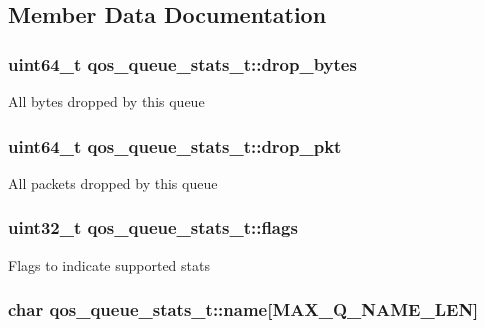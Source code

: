 \subsection{Member Data Documentation}
\hypertarget{structqos__queue__stats__t_a86e9a12c3218b8a91d62a3da95b2daf8}{
\subsubsection[{drop\-\_\-bytes}]{\setlength{\rightskip}{0pt plus 5cm}uint64\-\_\-t qos\-\_\-queue\-\_\-stats\-\_\-t\-::drop\-\_\-bytes}}\label{structqos__queue__stats__t_a86e9a12c3218b8a91d62a3da95b2daf8}
All bytes dropped by this queue \hypertarget{structqos__queue__stats__t_a68c4ac994cb234e4d12b8d41c726b5be}{
\subsubsection[{drop\-\_\-pkt}]{\setlength{\rightskip}{0pt plus 5cm}uint64\-\_\-t qos\-\_\-queue\-\_\-stats\-\_\-t\-::drop\-\_\-pkt}}\label{structqos__queue__stats__t_a68c4ac994cb234e4d12b8d41c726b5be}
All packets dropped by this queue \hypertarget{structqos__queue__stats__t_a151f189f991fa0564835e9e5c37bde29}{
\subsubsection[{flags}]{\setlength{\rightskip}{0pt plus 5cm}uint32\-\_\-t qos\-\_\-queue\-\_\-stats\-\_\-t\-::flags}}\label{structqos__queue__stats__t_a151f189f991fa0564835e9e5c37bde29}
Flags to indicate supported stats \hypertarget{structqos__queue__stats__t_a86a3a95e8e4a3bfaa4a18adf7e0e774b}{
\subsubsection[{name}]{\setlength{\rightskip}{0pt plus 5cm}char qos\-\_\-queue\-\_\-stats\-\_\-t\-::name\mbox{[}{\bf M\-A\-X\-\_\-\-Q\-\_\-\-N\-A\-M\-E\-\_\-\-L\-E\-N}\mbox{]}}}\label{structqos__queue__stats__t_a86a3a95e8e4a3bfaa4a18adf7e0e774b}
